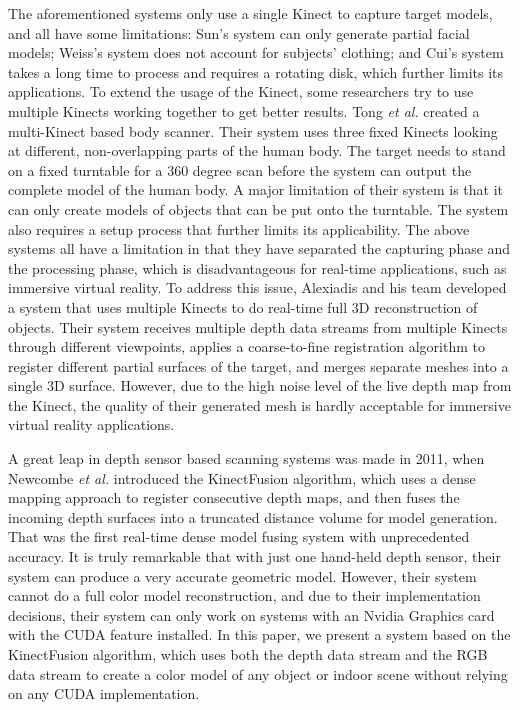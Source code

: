 \documentclass[12pt]{article}
\begin{document}
The aforementioned systems only use a single Kinect to capture target models, and all have some limitations: Sun's system can only generate partial facial models; Weiss's system does not account for subjects' clothing; and Cui's system takes a long time to process and requires a rotating disk, which further limits its applications. To extend the usage of the Kinect, some researchers try to use multiple Kinects working together to get better results. Tong \textit{et al.}\cite{Tong2012} created a multi-Kinect based body scanner. Their system uses three fixed Kinects looking at different, non-overlapping parts of the human body. The target needs to stand on a fixed turntable for a 360 degree scan before the system can output the complete model of the human body. A major limitation of their system is that it can only create models of objects that can be put onto the turntable. The system also requires a setup process that further limits its applicability. The above systems all have a limitation in that they have separated the capturing phase and the processing phase, which is disadvantageous for real-time applications, such as immersive virtual reality. To address this issue, Alexiadis and his team\cite{Alexiadis2013} developed a system that uses multiple Kinects to do real-time full 3D reconstruction of objects. Their system receives multiple depth data streams from multiple Kinects through different viewpoints, applies a coarse-to-fine registration algorithm to register different partial surfaces of the target, and merges separate meshes into a single 3D surface. However, due to the high noise level of the live depth map from the Kinect, the quality of their generated mesh is hardly acceptable for immersive virtual reality applications. 

A great leap in depth sensor based scanning systems was made in 2011, when Newcombe \textit{et al.}\cite{Newcombe2011} introduced the KinectFusion algorithm, which uses a dense mapping approach to register consecutive depth maps, and then fuses the incoming depth surfaces into a truncated distance volume for model generation. That was the first real-time dense model fusing system with unprecedented accuracy. It is truly remarkable that with just one hand-held depth sensor, their system can produce a very accurate geometric model. However, their system cannot do a full color model reconstruction, and due to their implementation decisions, their system can only work on systems with an Nvidia Graphics card with the CUDA feature installed.  In this paper, we present a system based on the KinectFusion algorithm, which uses both the depth data stream and the RGB data stream to create a color model of any object or indoor scene without relying on any CUDA implementation.
\end{document}
